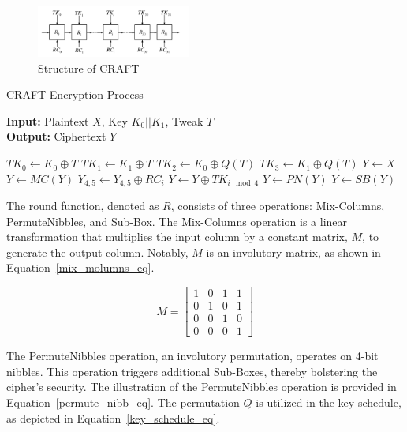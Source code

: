 \documentclass[final,5p,times,twocolumn]{elsarticle}
\begin{document}
\begin{figure}[h]%
    \centering
    \includegraphics[width=0.45\textwidth]{./fig/struct-craft.pdf}
    \caption{Structure of CRAFT}\label{fig1}
\end{figure}

\begin{algorithm}[h]
    \caption{CRAFT Encryption Process}\label{alg1}
    \textbf{Input:} Plaintext $X$, Key $K_0||K_1$, Tweak $T$ \\
    \textbf{Output:} Ciphertext $Y$
    \begin{algorithmic}[1]
        \State $TK_0 \gets K_0\oplus T$
        \State $TK_1 \gets K_1\oplus T$
        \State $TK_2 \gets K_0\oplus Q(T)$
        \State $TK_3 \gets K_1\oplus Q(T)$
        \State $Y \gets X$
        \State $Y \gets MC(Y)$
        \State $Y_{4,5} \gets Y_{4,5}\oplus RC_i$
        \State $Y \gets Y \oplus TK_{i\mod 4}$
        \State $Y \gets PN(Y)$
        \State $Y \gets SB(Y)$
        \EndIf
        \EndFor
    \end{algorithmic}
\end{algorithm}

The round function, denoted as $R$, consists of three operations: Mix-Columns, PermuteNibbles, and Sub-Box. The Mix-Columns operation is a linear transformation that multiplies the input column by a constant matrix, $M$, to generate the output column. Notably, $M$ is an involutory matrix, as shown in Equation~\ref{mix_molumns_eq}.


\begin{equation}
    M =
    \begin{bmatrix}
        1 & 0 & 1 & 1 \\
        0 & 1 & 0 & 1 \\
        0 & 0 & 1 & 0 \\
        0 & 0 & 0 & 1
    \end{bmatrix}
    \label{mix_molumns_eq}
\end{equation}

The PermuteNibbles operation, an involutory permutation, operates on 4-bit nibbles. This operation triggers additional Sub-Boxes, thereby bolstering the cipher's security. The illustration of the PermuteNibbles operation is provided in Equation~\ref{permute_nibb_eq}. The permutation $Q$ is utilized in the key schedule, as depicted in Equation~\ref{key_schedule_eq}.
\end{document}
